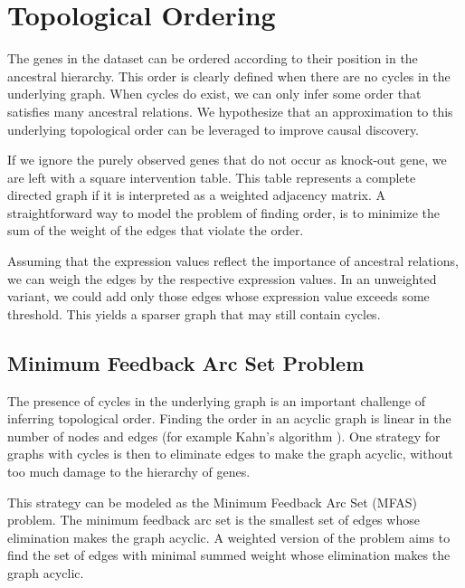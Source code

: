 \newpage
\section{Topological Ordering}






The genes in the dataset can be ordered according to their position in the ancestral hierarchy. This order is clearly defined when there are no cycles in the underlying graph. When cycles do exist, we can only infer some order that satisfies many ancestral relations. We hypothesize that an approximation to this underlying topological order can be leveraged to improve causal discovery.

If we ignore the purely observed genes that do not occur as knock-out gene, we are left with a square intervention table. This table represents a complete directed graph if it is interpreted as a weighted adjacency matrix. A straightforward way to model the problem of finding order, is to minimize the sum of the weight of the edges that violate the order. 

Assuming that the expression values reflect the importance of ancestral relations, we can weigh the edges by the respective expression values. In an unweighted variant, we could add only those edges whose expression value exceeds some threshold. This yields a sparser graph that may still contain cycles.

\subsection{Minimum Feedback Arc Set Problem}
The presence of cycles in the underlying graph is an important challenge of inferring topological order. Finding the order in an acyclic graph is linear in the number of nodes and edges (for example Kahn's algorithm ). One strategy for graphs with cycles is then to eliminate edges to make the graph acyclic, without too much damage to the hierarchy of genes.

This strategy can be modeled as the Minimum Feedback Arc Set (MFAS) problem. The minimum feedback arc set is the smallest set of edges whose elimination makes the graph acyclic. A weighted version of the problem aims to find the set of edges with minimal summed weight whose elimination makes the graph acyclic.

